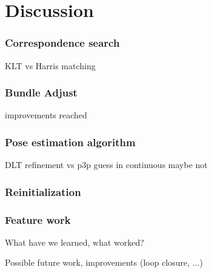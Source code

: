 \section{Discussion}

\subsubsection{Correspondence search}
KLT vs Harris matching

\subsubsection{Bundle Adjust}
improvements reached

\subsubsection{Pose estimation algorithm}
DLT refinement vs p3p guess in continuous  maybe not

\subsubsection{Reinitialization}

\subsubsection{Feature work}
What have we learned, what worked?

Possible future work, improvements (loop closure, ...)
